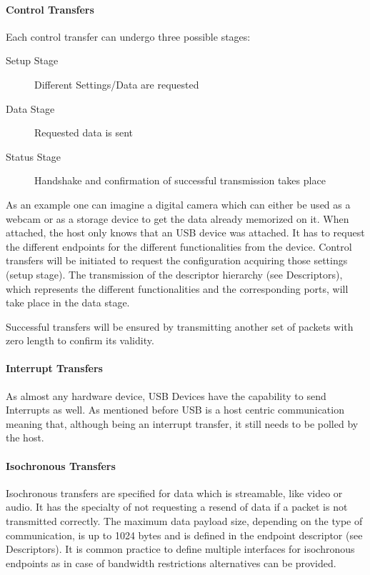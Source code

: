 \paragraph{Control Transfers}
Each control transfer can undergo three possible stages: 
\begin{description}
 \item[Setup Stage]Different Settings/Data are requested
 \item[Data Stage] Requested data is sent
 \item[Status Stage] Handshake and confirmation of successful transmission takes place
\end{description}

As an example one can imagine a digital camera which can either be used as a webcam or as a storage device to get the data already 
memorized on it. When attached, the host only knows that an USB device was attached. It has to request the different endpoints for the 
different functionalities from the device. Control transfers will be initiated to request the configuration acquiring those settings 
(setup stage). The transmission of the
descriptor hierarchy (see Descriptors), which represents the different functionalities and the corresponding ports, will take place in 
the data stage.

Successful transfers will be ensured by transmitting another set of packets with zero length to confirm its validity.

\paragraph{Interrupt Transfers}
As almost any hardware device, USB Devices have the capability to send Interrupts as well. As mentioned before USB is a host centric communication 
meaning that, although being an interrupt transfer, it still needs to be polled by the host. 
\paragraph{Isochronous Transfers}
Isochronous transfers are specified for data which is streamable, like video or audio. It has the specialty of not requesting a resend of data if a packet is not transmitted correctly. The maximum data payload size, depending on the type of communication, is up to 1024 bytes and is defined in the endpoint descriptor (see Descriptors). It is common practice to define multiple interfaces for isochronous endpoints as in case of bandwidth restrictions alternatives can be provided.

